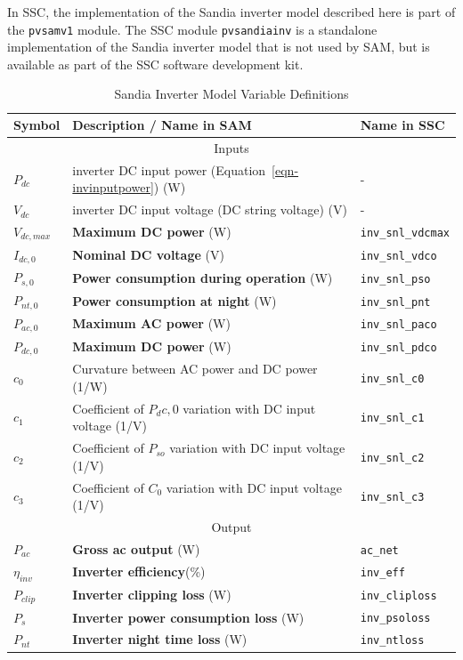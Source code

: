 \documentclass[12pt,letterpaper]{article}
\begin{document}
In SSC, the implementation of the Sandia inverter model described here is part of the \texttt{pvsamv1} module. The SSC module \texttt{pvsandiainv} is a standalone implementation of the Sandia inverter model that is not used by SAM, but is available as part of the SSC software development kit.

\begin{table}
\begin{center}
\caption{Sandia Inverter Model Variable Definitions}
\begin{tabular}{lll}
\midrule
Symbol & Description / \textbf{Name in SAM} & Name in SSC \\
\midrule
\multicolumn{3}{c}{Inputs}\\
$P_{dc}$ & inverter DC input power (Equation~\ref{eqn-invinputpower}) (W) & - \\
$V_{dc}$ & inverter DC input voltage (DC string voltage) (V) & - \\
$V_{dc,max}$ & \textbf{Maximum DC power} (W)& \texttt{inv\_snl\_vdcmax} \\
$I_{dc,0}$ & \textbf{Nominal DC voltage} (V)& \texttt{inv\_snl\_vdco} \\
$P_{s,0}$ & \textbf{Power consumption during operation} (W)& \texttt{inv\_snl\_pso} \\
$P_{nt,0}$ & \textbf{Power consumption at night} (W)& \texttt{inv\_snl\_pnt} \\
$P_{ac,0}$ & \textbf{Maximum AC power} (W)& \texttt{inv\_snl\_paco} \\
$P_{dc,0}$ & \textbf{Maximum DC power} (W) & \texttt{inv\_snl\_pdco} \\
$c_0$ & Curvature between AC power and DC power (1/W) & \texttt{inv\_snl\_c0} \\
$c_1$ & Coefficient of $P_dc,0$ variation with DC input voltage (1/V) &  \texttt{inv\_snl\_c1} \\
$c_2$ & Coefficient of $P_{so}$ variation with DC input voltage (1/V) &\texttt{inv\_snl\_c2} \\
$c_3$ & Coefficient of $C_0$ variation with DC input voltage (1/V) & \texttt{inv\_snl\_c3} \\
\midrule
\multicolumn{3}{c}{Output}\\
$P_{ac}$ & \textbf{Gross ac output} (W)& \texttt{ac\_net} \\
$\eta_{inv}$ & \textbf{Inverter efficiency}(\%) & \texttt{inv\_eff}  \\
$P_{clip}$ & \textbf{Inverter clipping loss} (W)& \texttt{inv\_cliploss}  \\
$P_{s}$ & \textbf{Inverter power consumption loss} (W)& \texttt{inv\_psoloss}  \\
$P_{nt}$ & \textbf{Inverter night time loss} (W)& \texttt{inv\_ntloss}  \\
\hline
\end{tabular}
\label{tab-sandiainvertervars}
\end{center}
\end{table}
\end{document}
